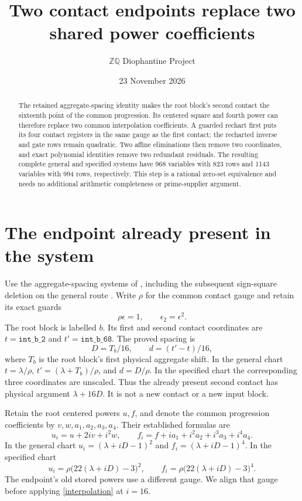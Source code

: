 \documentclass[11pt]{article}
\title{Two contact endpoints replace two shared power coefficients}
\author{\(\mathbb Z\mathbb Q\) Diophantine Project}
\date{23 November 2026}
\begin{document}
\maketitle

\begin{abstract}
The retained aggregate-spacing identity makes the root block's second
contact the sixteenth point of the common progression. Its centered
square and fourth power can therefore replace two common interpolation
coefficients. A guarded rechart first puts its four contact registers
in the same gauge as the first contact; the recharted inverse and gate
rows remain quadratic. Two affine eliminations then remove two
coordinates, and exact polynomial identities remove two redundant
residuals. The resulting complete general and specified systems have
968 variables with 823 rows and 1143 variables with 994 rows,
respectively. This step is a rational zero-set equivalence and needs
no additional arithmetic completeness or prime-supplier argument.
\end{abstract}

\section{The endpoint already present in the system}

Use the aggregate-spacing systems of \cite{Spacing}, including the
subsequent sign-square deletion on the general route \cite{Branch}.
Write \(\rho\) for the common contact gauge and retain its exact
guards
\[
                 \rho\epsilon=1,\qquad \epsilon_2=\epsilon^2.
\]
The root block is labelled \(b\). Its first and second contact
coordinates are \(t=\texttt{int\_b\_2}\) and
\(t'=\texttt{int\_b\_68}\). The proved spacing is
\[
 D=T_b/16,\qquad d=(t'-t)/16,
\]
where \(T_b\) is the root block's first physical aggregate shift.
In the general chart \(t=\lambda/\rho\),
\(t'=(\lambda+T_b)/\rho\), and \(d=D/\rho\).
In the specified chart the corresponding three coordinates are
unscaled. Thus the already present second contact has physical
argument \(\lambda+16D\). It is not a new contact or a new input
block.

Retain the root centered powers \(u,f\), and denote the common
progression coefficients by \(v,w,a_1,a_2,a_3,a_4\). Their
established formulas are
\begin{equation}\label{interpolation}
 u_i=u+2iv+i^2w,\qquad
 f_i=f+ia_1+i^2a_2+i^3a_3+i^4a_4.
\end{equation}
In the general chart \(u_i=(\lambda+iD-1)^2\) and
\(f_i=(\lambda+iD-1)^4\). In the specified chart
\[
 u_i=\rho\bigl(22(\lambda+iD)-3\bigr)^2,
 \qquad f_i=\rho\bigl(22(\lambda+iD)-3\bigr)^4.
\]
The endpoint's old stored powers use a different gauge. We align
that gauge before applying \eqref{interpolation} at \(i=16\).
\end{document}
